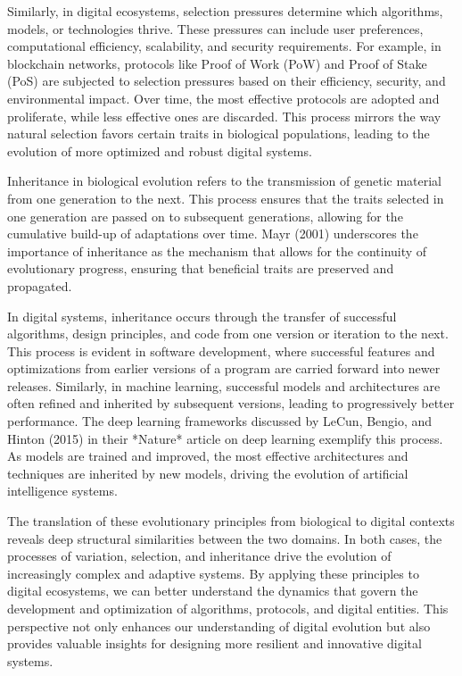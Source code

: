 \documentclass[12pt,twoside]{article}
\begin{document}
Similarly, in digital ecosystems, selection pressures determine which algorithms, models, or technologies thrive. These pressures can include user preferences, computational efficiency, scalability, and security requirements. For example, in blockchain networks, protocols like Proof of Work (PoW) and Proof of Stake (PoS) are subjected to selection pressures based on their efficiency, security, and environmental impact. Over time, the most effective protocols are adopted and proliferate, while less effective ones are discarded. This process mirrors the way natural selection favors certain traits in biological populations, leading to the evolution of more optimized and robust digital systems.

Inheritance in biological evolution refers to the transmission of genetic material from one generation to the next. This process ensures that the traits selected in one generation are passed on to subsequent generations, allowing for the cumulative build-up of adaptations over time. Mayr (2001) underscores the importance of inheritance as the mechanism that allows for the continuity of evolutionary progress, ensuring that beneficial traits are preserved and propagated.

In digital systems, inheritance occurs through the transfer of successful algorithms, design principles, and code from one version or iteration to the next. This process is evident in software development, where successful features and optimizations from earlier versions of a program are carried forward into newer releases. Similarly, in machine learning, successful models and architectures are often refined and inherited by subsequent versions, leading to progressively better performance. The deep learning frameworks discussed by LeCun, Bengio, and Hinton (2015) in their *Nature* article on deep learning exemplify this process. As models are trained and improved, the most effective architectures and techniques are inherited by new models, driving the evolution of artificial intelligence systems.

The translation of these evolutionary principles from biological to digital contexts reveals deep structural similarities between the two domains. In both cases, the processes of variation, selection, and inheritance drive the evolution of increasingly complex and adaptive systems. By applying these principles to digital ecosystems, we can better understand the dynamics that govern the development and optimization of algorithms, protocols, and digital entities. This perspective not only enhances our understanding of digital evolution but also provides valuable insights for designing more resilient and innovative digital systems.
\end{document}
